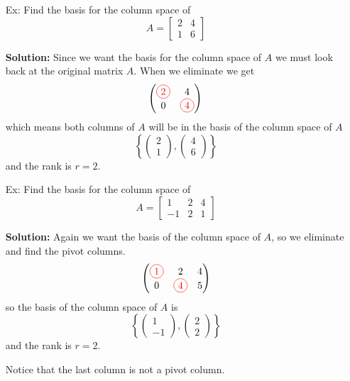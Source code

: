 \documentclass[reqno]{amsart}
\theoremstyle{definition}
\begin{document}
\begin{enumerate}

\item[Ex:  ]  Find the basis for the column space of
%
\begin{equation*}
A = \begin{bmatrix}
2 & 4\\
1 & 6
\end{bmatrix}
\end{equation*}

\textbf{Solution:  }
Since we want the basis for the column space of $A$ we must look back at the original matrix $A$.
When we eliminate we get
%
\begin{equation*}
\begin{pmatrix}
\circled{2} & 4\\
0 & \circled{4}
\end{pmatrix}
\end{equation*}
%
which means both columns of $A$ will be in the basis of the column space of $A$
%
\begin{equation*}
\left\lbrace \begin{pmatrix}
2\\
1
\end{pmatrix}, \begin{pmatrix}
4\\
6
\end{pmatrix}\right\rbrace
\end{equation*}
%
and the rank is $r = 2$.

\item[Ex:  ]  Find the basis for the column space of
%
\begin{equation*}
A = \begin{bmatrix}
1 & 2 & 4\\
-1 & 2 & 1
\end{bmatrix}
\end{equation*}

\textbf{Solution:  }
Again we want the basis of the column space of $A$, so we eliminate and find the pivot columns.
%
\begin{equation*}
\begin{pmatrix}
\circled{1} & 2 & 4\\
0 & \circled{4} & 5
\end{pmatrix}
\end{equation*}
%
so the basis of the column space of $A$ is
%
\begin{equation*}
\left\lbrace \begin{pmatrix}
1\\
-1
\end{pmatrix}, \begin{pmatrix}
2\\
2
\end{pmatrix}\right\rbrace
\end{equation*}
%
and the rank is $r = 2$.

Notice that the last column is not a pivot column.

\end{enumerate}
\end{document}
